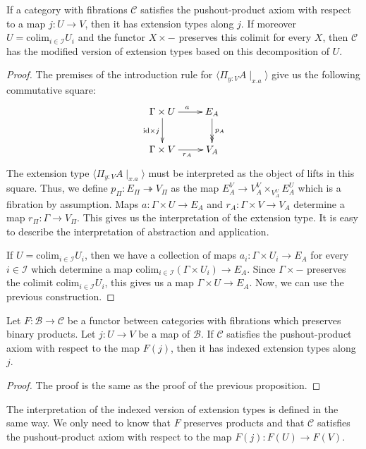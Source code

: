 \documentclass[reqno]{amsart}
\theoremstyle{definition}
\theoremstyle{remark}
\newcommand{\fs}[1]{\mathrm{#1}}
\newcommand{\scat}[1]{\mathcal{#1}}
\newcommand{\id}{\fs{id}}
\numberwithin{figure}{section}
\begin{document}
\begin{prop}
If a category with fibrations $\scat{C}$ satisfies the pushout-product axiom with respect to a map $j : U \to V$, then it has extension types along $j$.
If moreover $U = \fs{colim}_{i \in \scat{I}} U_i$ and the functor $X \times -$ preserves this colimit for every $X$, then $\scat{C}$ has the modified version of extension types based on this decomposition of $U$.
\end{prop}
\begin{proof}
The premises of the introduction rule for $\langle \Pi_{y : V} A \mid_{x.a} \rangle$ give us the following commutative square:
\[ \xymatrix{ \Gamma \times U \ar[r]^a \ar[d]_{\id \times j}    & E_A \ar@{->>}[d]^{p_A} \\
              \Gamma \times V \ar[r]_{r_A}                      & V_A
            } \]
The extension type $\langle \Pi_{y : V} A \mid_{x.a} \rangle$ must be interpreted as the object of lifts in this square.
Thus, we define $p_\Pi : E_\Pi \twoheadrightarrow V_\Pi$ as the map $E_A^V \to V_A^V \times_{V_A^U} E_A^U$ which is a fibration by assumption.
Maps $a : \Gamma \times U \to E_A$ and $r_A : \Gamma \times V \to V_A$ determine a map $r_\Pi : \Gamma \to V_\Pi$.
This gives us the interpretation of the extension type.
It is easy to describe the interpretation of abstraction and application.

If $U = \fs{colim}_{i \in \scat{I}} U_i$, then we have a collection of maps $a_i : \Gamma \times U_i \to E_A$ for every $i \in \mathcal{I}$
which determine a map $\fs{colim}_{i \in \mathcal{I}}(\Gamma \times U_i) \to E_A$.
Since $\Gamma \times -$ preserves the colimit $\fs{colim}_{i \in \mathcal{I}} U_i$, this gives us a map $\Gamma \times U \to E_A$.
Now, we can use the previous construction.
\end{proof}

\begin{prop}
Let $F : \scat{B} \to \scat{C}$ be a functor between categories with fibrations which preserves binary products.
Let $j : U \to V$ be a map of $\scat{B}$.
If $\scat{C}$ satisfies the pushout-product axiom with respect to the map $F(j)$, then it has indexed extension types along $j$.
\end{prop}
\begin{proof}
The proof is the same as the proof of the previous proposition.
\end{proof}

\begin{remark}
The interpretation of the indexed version of extension types is defined in the same way.
We only need to know that $F$ preserves products and that $\scat{C}$ satisfies the pushout-product axiom with respect to the map $F(j) : F(U) \to F(V)$.
\end{remark}
\end{document}
